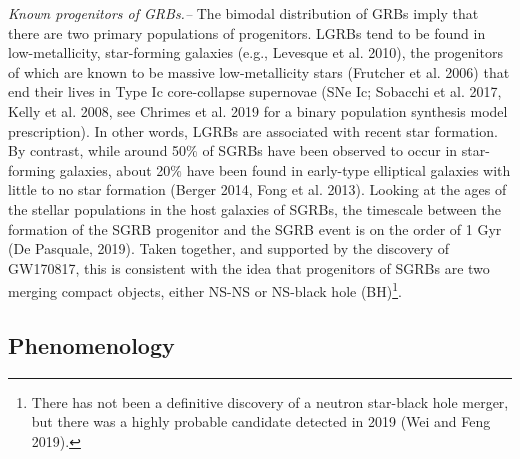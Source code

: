 \documentclass[1.5,11pt]{beavtex}
\begin{document}
\textit{Known progenitors of GRBs.–} The bimodal distribution of GRBs imply that there are two primary populations of progenitors. LGRBs tend to be found in low-metallicity, star-forming galaxies (e.g., Levesque et al. 2010), the progenitors of which are known to be massive low-metallicity stars (Frutcher et al. 2006) that end their lives in Type Ic core-collapse supernovae (SNe Ic; Sobacchi et al. 2017, Kelly et al. 2008, see Chrimes et al. 2019 for a binary population synthesis model prescription). In other words, LGRBs are associated with recent star formation. By contrast, while around 50$\%$ of SGRBs have been observed to occur in star-forming galaxies, about 20$\%$ have been found in early-type elliptical galaxies with little to no star formation (Berger 2014, Fong et al. 2013). Looking at the ages of the stellar populations in the host galaxies of SGRBs, the timescale between the formation of the SGRB progenitor and the SGRB event is on the order of 1 Gyr (De Pasquale, 2019). Taken together, and supported by the discovery of GW170817, this is consistent with the idea that progenitors of SGRBs are two merging compact objects, either NS-NS or NS-black hole (BH)\footnote{\selectfont There has not been a definitive discovery of a neutron star-black hole merger, but there was a highly probable candidate detected in 2019 (Wei and Feng 2019).}.


\subsection{Phenomenology}
\label{ch:Astro theory ssec:GRB phenom}
\end{document}
